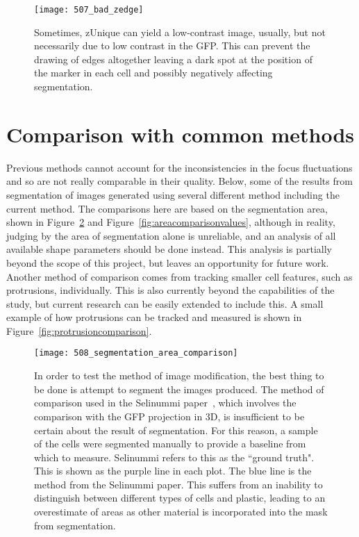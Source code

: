 \begin{figure}[h!]
 \centering
 \texttt{[image: 507\_bad\_zedge]}
 \caption[Ineffective zEdge]{
 	Sometimes, zUnique can yield a low-contrast image, usually, but not necessarily due to low contrast in the GFP. This can prevent the drawing of edges altogether leaving a dark spot at the position of the marker in each cell and possibly negatively affecting segmentation.
 }
 \label{fig:badzedge}
\end{figure}

\section{Comparison with common methods}

Previous methods cannot account for the inconsistencies in the focus fluctuations and so are not really comparable in their quality. Below, some of the results from segmentation of images generated using several different method including the current method. The comparisons here are based on the segmentation area, shown in Figure~\ref{fig:areacomparison} and Figure~\ref{fig:areacomparisonvalues}, although in reality, judging by the area of segmentation alone is unreliable, and an analysis of all available shape parameters should be done instead. This analysis is partially beyond the scope of this project, but leaves an opportunity for future work. Another method of comparison comes from tracking smaller cell features, such as protrusions, individually. This is also currently beyond the capabilities of the study, but current research can be easily extended to include this. A small example of how protrusions can be tracked and measured is shown in Figure~\ref{fig:protrusioncomparison}.

\begin{figure}[h!]
 \centering
 \texttt{[image: 508\_segmentation\_area\_comparison]}
 \caption[Testing: segmentation area comparison]{
 	In order to test the method of image modification, the best thing to be done is attempt to segment the images produced. The method of comparison used in the Selinummi paper~\cite{Selinummi:09}, which involves the comparison with the GFP projection in 3D, is insufficient to be certain about the result of segmentation. For this reason, a sample of the cells were segmented manually to provide a baseline from which to measure. Selinummi refers to this as the ``ground truth". This is shown as the purple line in each plot. The blue line is the method from the Selinummi paper. This suffers from an inability to distinguish between different types of cells and plastic, leading to an overestimate of areas as other material is incorporated into the mask from segmentation.
 }
 \label{fig:areacomparison}
\end{figure}

